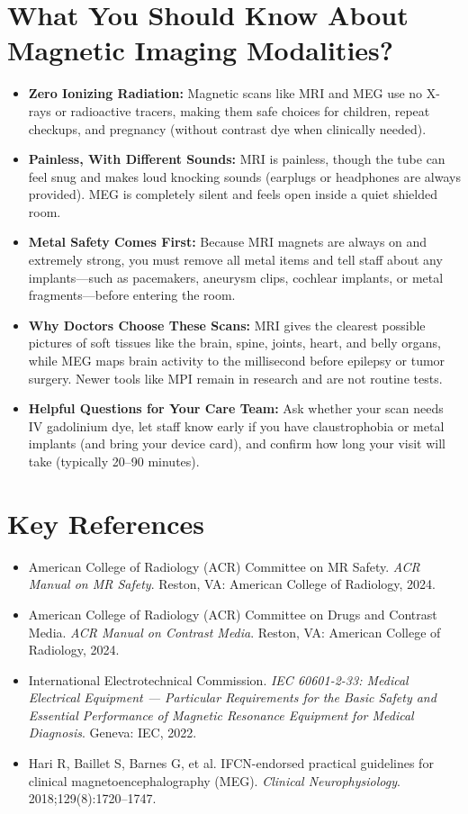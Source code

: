 \section{What You Should Know About Magnetic Imaging Modalities?}
\begin{itemize}
  \item \textbf{Zero Ionizing Radiation:} Magnetic scans like MRI and MEG use no X-rays or radioactive tracers, making them safe choices for children, repeat checkups, and pregnancy (without contrast dye when clinically needed).
  \item \textbf{Painless, With Different Sounds:} MRI is painless, though the tube can feel snug and makes loud knocking sounds (earplugs or headphones are always provided). MEG is completely silent and feels open inside a quiet shielded room.
  \item \textbf{Metal Safety Comes First:} Because MRI magnets are always on and extremely strong, you must remove all metal items and tell staff about any implants---such as pacemakers, aneurysm clips, cochlear implants, or metal fragments---before entering the room.
  \item \textbf{Why Doctors Choose These Scans:} MRI gives the clearest possible pictures of soft tissues like the brain, spine, joints, heart, and belly organs, while MEG maps brain activity to the millisecond before epilepsy or tumor surgery. Newer tools like MPI remain in research and are not routine tests.
  \item \textbf{Helpful Questions for Your Care Team:} Ask whether your scan needs IV gadolinium dye, let staff know early if you have claustrophobia or metal implants (and bring your device card), and confirm how long your visit will take (typically 20--90 minutes).
\end{itemize}

\section{Key References}
\begin{itemize}
  \item American College of Radiology (ACR) Committee on MR Safety. \emph{ACR Manual on MR Safety}. Reston, VA: American College of Radiology, 2024.
  \item American College of Radiology (ACR) Committee on Drugs and Contrast Media. \emph{ACR Manual on Contrast Media}. Reston, VA: American College of Radiology, 2024.
  \item International Electrotechnical Commission. \emph{IEC 60601-2-33: Medical Electrical Equipment --- Particular Requirements for the Basic Safety and Essential Performance of Magnetic Resonance Equipment for Medical Diagnosis}. Geneva: IEC, 2022.
  \item Hari R, Baillet S, Barnes G, et al. IFCN-endorsed practical guidelines for clinical magnetoencephalography (MEG). \emph{Clinical Neurophysiology}. 2018;129(8):1720--1747.
\end{itemize}

